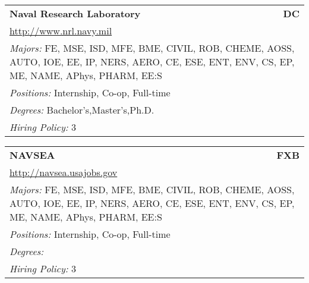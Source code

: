 \documentclass[twoside]{article}
\begin{document}
\begin{center}
\begin{multicols}{3}
\begin{FlushLeft}
\begin{minipage}{.9\columnwidth}
\end{minipage}
 
\begin{minipage}{.9\columnwidth}\begin{tabularx}{.95\columnwidth}{Xr}
                 {\Large\bf Naval Research Laboratory} & {\Large\bf DC}\\
    \multicolumn{2}{p{.95\columnwidth}}{\url{http://www.nrl.navy.mil}}\\
    \multicolumn{2}{p{.95\columnwidth}}{\emph{Majors:} FE, MSE, ISD, MFE, BME, CIVIL, ROB, CHEME, AOSS, AUTO, IOE, EE, IP, NERS, AERO, CE, ESE, ENT, ENV, CS, EP, ME, NAME, APhys, PHARM, EE:S}\\
    \multicolumn{2}{p{.95\columnwidth}}{\emph{Positions:} Internship, Co-op, Full-time}\\
    \multicolumn{2}{p{.95\columnwidth}}{\emph{Degrees:} Bachelor's,Master's,Ph.D.}\\
    \multicolumn{2}{p{.95\columnwidth}}{\emph{Hiring Policy:} 3}\\
    \end{tabularx}
    
\end{minipage}
 
\begin{minipage}{.9\columnwidth}\begin{tabularx}{.95\columnwidth}{Xr}
                 {\Large\bf NAVSEA} & {\Large\bf FXB}\\
    \multicolumn{2}{p{.95\columnwidth}}{\url{http://navsea.usajobs.gov}}\\
    \multicolumn{2}{p{.95\columnwidth}}{\emph{Majors:} FE, MSE, ISD, MFE, BME, CIVIL, ROB, CHEME, AOSS, AUTO, IOE, EE, IP, NERS, AERO, CE, ESE, ENT, ENV, CS, EP, ME, NAME, APhys, PHARM, EE:S}\\
    \multicolumn{2}{p{.95\columnwidth}}{\emph{Positions:} Internship, Co-op, Full-time}\\
    \multicolumn{2}{p{.95\columnwidth}}{\emph{Degrees:} }\\
    \multicolumn{2}{p{.95\columnwidth}}{\emph{Hiring Policy:} 3}\\
    \end{tabularx}
    
\end{minipage}
 

\end{FlushLeft}
\end{multicols}
\end{center}
\end{document}
